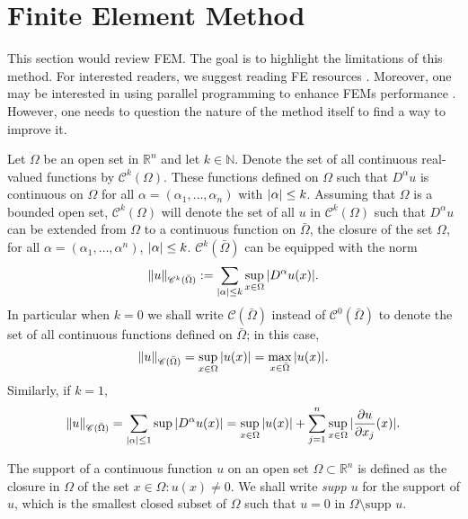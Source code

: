 \section{Finite Element Method}
\label{sec:finite_element_method}
This section would review FEM. The goal is to highlight the limitations of this method. For interested readers, we suggest reading FE resources \cite{suli2012lecture, johnson2012numerical}. Moreover, one may be interested in using parallel programming to enhance FEMs performance \cite{douglas2003tutorial}. However, one needs to question the nature of the method itself to find a way to improve it.
\begin{notation}
	Let $\Omega$ be an open set in $\mathbb{R}^n$ and let $k \in \mathbb{N}$. Denote the set of all continuous real-valued functions by $\mathscr{C}^k(\Omega)$. These functions defined on $\Omega$ such that $D^\alpha u$ is continuous on $\Omega$ for all $\alpha = (\alpha_1 , \dots, \alpha_n)$ with $\vert\alpha\vert \leq k$. Assuming that $\Omega$ is a bounded open set, $\mathscr{C}^k (\Omega)$ will denote the set of all $u$ in $\mathscr{C}^k (\Omega)$ such that $D^\alpha u$ can be extended from $\Omega$ to a continuous function on $\bar{\Omega}$, the closure of the set $\Omega$, for all $\alpha = (\alpha_1 , \dots, \alpha^n)$, $\vert\alpha\vert \leq k$.
 $\mathscr{C}^k (\bar{\Omega})$ can be equipped with the norm
	\begin{equation*}
		\left\lVert u\right\rVert_{\mathscr{C}^k(\bar{\Omega})} := \sum_{\vert\alpha\vert \leq k} \sup_{x\in\Omega} \vert D^\alpha u(x)\vert.
	\end{equation*}
	In particular when $k = 0$ we shall write $\mathscr{C}(\bar{\Omega})$ instead of $\mathscr{C}^{0}(\bar{\Omega})$ to denote the set of all continuous functions defined on $\bar{\Omega}$; in this case,
	\begin{equation*}
		\left\lVert u\right\rVert_{\mathscr{C}(\bar{\Omega})} = \sup_{x\in\Omega} \vert u(x)\vert = \max_{x\in\bar{\Omega}} \vert u(x)\vert.
	\end{equation*}
	Similarly, if $k = 1$,
	\begin{equation*}
		\left\lVert u\right\rVert_{\mathscr{C}(\bar{\Omega})} = \sum_{\vert\alpha\vert\leq 1} \sup \vert D^\alpha u(x)\vert = \sup_{x\in\Omega} \vert u(x)\vert + \sum_{j=1}^{n} \sup_{x\in\Omega} \vert\frac{\partial u}{\partial x_j}(x)\vert.
	\end{equation*}
\end{notation}
\begin{defn}
	The support of a continuous function $u$ on an open set $\Omega \subset \mathbb{R}^n$ is defined as the closure in $\Omega$ of the set ${x \in \Omega : u(x) \neq 0}$. We shall write \textit{supp $u$} for the support of $u$, which is the smallest closed subset of $\Omega$ such that $u = 0$ in $\Omega\setminus\text{supp } u$.
\end{defn}
